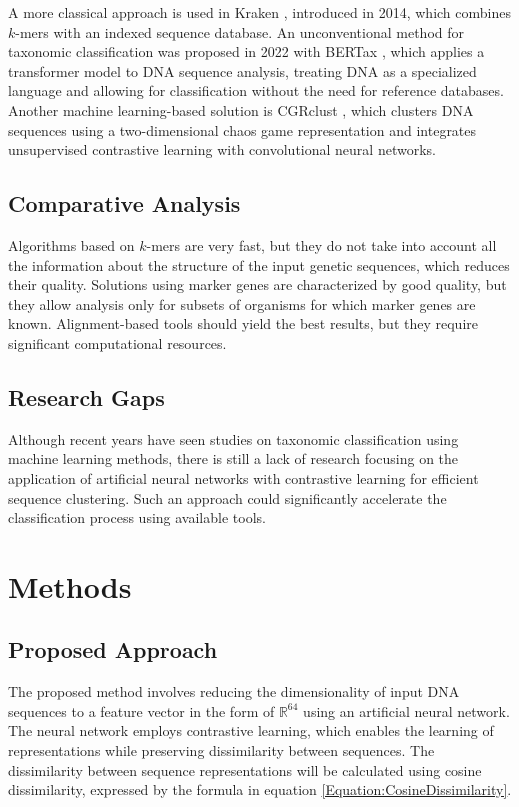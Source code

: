\documentclass[pdflatex,sn-vancouver-num]{sn-jnl}%
\begin{document}
                A more classical approach is used in Kraken \cite{Wood:2014}, introduced in 2014, which combines $k$-mers with an indexed sequence database. An unconventional method for taxonomic classification was proposed in 2022 with BERTax \cite{Mock:2022}, which applies a transformer model \cite{Transformers} to DNA sequence analysis, treating DNA as a specialized language and allowing for classification without the need for reference databases. Another machine learning-based solution is CGRclust \cite{Alipour:2024}, which clusters DNA sequences using a two-dimensional chaos game representation and integrates unsupervised contrastive learning with convolutional neural networks.

            \subsection{Comparative Analysis}
                Algorithms based on $k$-mers are very fast, but they do not take into account all the information about the structure of the input genetic sequences, which reduces their quality. Solutions using marker genes are characterized by good quality, but they allow analysis only for subsets of organisms for which marker genes are known. Alignment-based tools should yield the best results, but they require significant computational resources.

            \subsection{Research Gaps}
                Although recent years have seen studies on taxonomic classification using machine learning methods, there is still a lack of research focusing on the application of artificial neural networks with contrastive learning for efficient sequence clustering. Such an approach could significantly accelerate the classification process using available tools.

    \section{Methods}

        \subsection{Proposed Approach}
            The proposed method involves reducing the dimensionality of input DNA sequences to a feature vector in the form of $\mathbb{R}^{64}$ using an artificial neural network. The neural network employs contrastive learning, which enables the learning of representations while preserving dissimilarity between sequences. The dissimilarity between sequence representations will be calculated using cosine dissimilarity, expressed by the formula in equation \eqref{Equation:CosineDissimilarity}.
\end{document}
